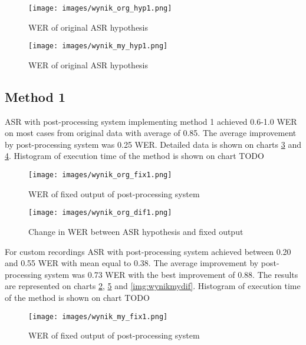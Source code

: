 \documentclass[a4paper,11pt,twoside]{report}
\theoremstyle{definition}
\begin{document}
\begin{figure}[H]{}
    \centering
    \texttt{[image: images/wynik\_org\_hyp1.png]}
    \caption{WER of original ASR hypothesis}
    \label{img:wynikorghyp}
\end{figure}

\begin{figure}[H]{}
    \centering
    \texttt{[image: images/wynik\_my\_hyp1.png]}
    \caption{WER of original ASR hypothesis}
    \label{img:wynikmyhyp}
\end{figure}

\subsection{Method 1}

ASR with post-processing system implementing method 1 achieved 0.6-1.0 WER on most cases from original data with average of 0.85. The average improvement by post-processing system was 0.25 WER. Detailed data is shown on charts \ref{img:wynikorgfix} and \ref{img:wynikorgdif}. Histogram of execution time of the method is shown on chart TODO\\

\begin{figure}[H]{}
    \centering
    \texttt{[image: images/wynik\_org\_fix1.png]}
    \caption{WER of fixed output of post-processing system}
    \label{img:wynikorgfix}
\end{figure}

\begin{figure}[H]{}
    \centering
    \texttt{[image: images/wynik\_org\_dif1.png]}
    \caption{Change in WER between ASR hypothesis and fixed output}
    \label{img:wynikorgdif}
\end{figure}

For custom recordings ASR with post-processing system achieved between 0.20 and 0.55 WER with mean equal to 0.38. The average improvement by post-processing system was 0.73 WER with the best improvement of 0.88. The results are represented on charts \ref{img:wynikmyhyp}, \ref{img:wynikmyfix} and \ref{img:wynikmydif}. Histogram of execution time of the method is shown on chart TODO\\

\begin{figure}[H]{}
    \centering
    \texttt{[image: images/wynik\_my\_fix1.png]}
    \caption{WER of fixed output of post-processing system}
    \label{img:wynikmyfix}
\end{figure}
\end{document}
